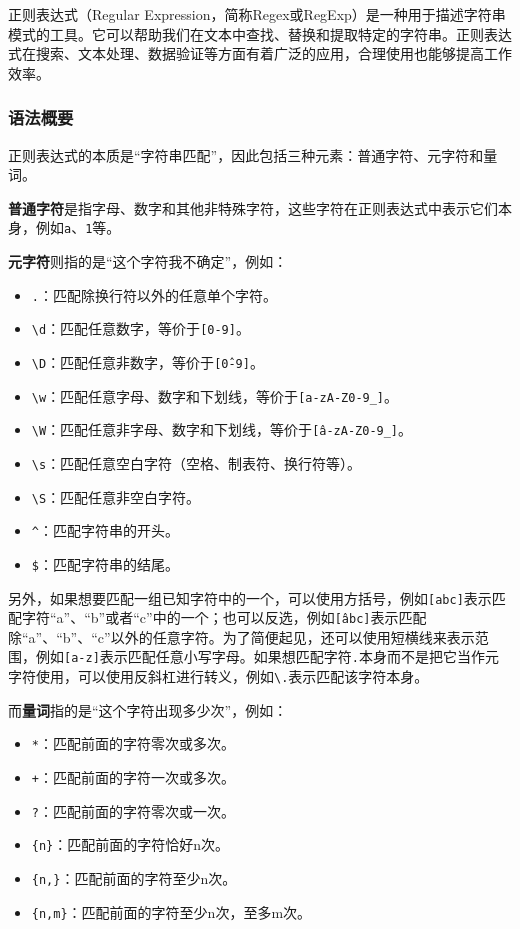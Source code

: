 正则表达式（Regular Expression，简称Regex或RegExp）是一种用于描述字符串模式的工具。它可以帮助我们在文本中查找、替换和提取特定的字符串。正则表达式在搜索、文本处理、数据验证等方面有着广泛的应用，合理使用也能够提高工作效率。

\subsubsection{语法概要}

正则表达式的本质是“字符串匹配”，因此包括三种元素：普通字符、元字符和量词。

\textbf{普通字符}是指字母、数字和其他非特殊字符，这些字符在正则表达式中表示它们本身，例如\texttt{a}、\texttt{1}等。

\textbf{元字符}则指的是“这个字符我不确定”，例如：
\begin{itemize}
  \item \texttt{.}：匹配除换行符以外的任意单个字符。
  \item \texttt{\textbackslash d}：匹配任意数字，等价于\texttt{[0-9]}。
  \item \texttt{\textbackslash D}：匹配任意非数字，等价于\texttt{[\^0-9]}。
  \item \texttt{\textbackslash w}：匹配任意字母、数字和下划线，等价于\texttt{[a-zA-Z0-9\_]}。
  \item \texttt{\textbackslash W}：匹配任意非字母、数字和下划线，等价于\texttt{[\^a-zA-Z0-9\_]}。
  \item \texttt{\textbackslash s}：匹配任意空白字符（空格、制表符、换行符等）。
  \item \texttt{\textbackslash S}：匹配任意非空白字符。
  \item \texttt{\^}：匹配字符串的开头。
  \item \texttt{\$}：匹配字符串的结尾。
\end{itemize}
另外，如果想要匹配一组已知字符中的一个，可以使用方括号，例如\texttt{[abc]}表示匹配字符“a”、“b”或者“c”中的一个；也可以反选，例如\texttt{[\^abc]}表示匹配除“a”、“b”、“c”以外的任意字符。为了简便起见，还可以使用短横线来表示范围，例如\texttt{[a-z]}表示匹配任意小写字母。如果想匹配字符\texttt{.}本身而不是把它当作元字符使用，可以使用反斜杠进行转义，例如\texttt{\textbackslash .}表示匹配该字符本身。

而\textbf{量词}指的是“这个字符出现多少次”，例如：
\begin{itemize}
  \item \texttt{*}：匹配前面的字符零次或多次。
  \item \texttt{+}：匹配前面的字符一次或多次。
  \item \texttt{?}：匹配前面的字符零次或一次。
  \item \texttt{\{n\}}：匹配前面的字符恰好n次。
  \item \texttt{\{n,\}}：匹配前面的字符至少n次。
  \item \texttt{\{n,m\}}：匹配前面的字符至少n次，至多m次。
\end{itemize}

